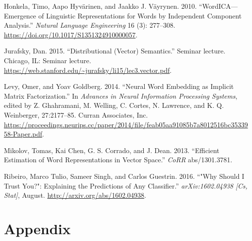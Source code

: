\documentclass{article}
\begin{document}
\leavevmode\hypertarget{ref-honkela_wordicaemergence_2010}{}%
Honkela, Timo, Aapo Hyvärinen, and Jaakko J. Väyrynen. 2010.
``WordICA---Emergence of Linguistic Representations for Words by
Independent Component Analysis.'' \emph{Natural Language Engineering} 16
(3): 277--308. \url{https://doi.org/10.1017/S1351324910000057}.

\leavevmode\hypertarget{ref-jurafsky_distributional_2015}{}%
Jurafsky, Dan. 2015. ``Distributional (Vector) Semantics.'' Seminar
lecture. Chicago, IL: Seminar lecture.
\url{https://web.stanford.edu/~jurafsky/li15/lec3.vector.pdf}.

\leavevmode\hypertarget{ref-levy_neural_2014}{}%
Levy, Omer, and Yoav Goldberg. 2014. ``Neural Word Embedding as Implicit
Matrix Factorization.'' In \emph{Advances in Neural Information
Processing Systems}, edited by Z. Ghahramani, M. Welling, C. Cortes, N.
Lawrence, and K. Q. Weinberger, 27:2177--85. Curran Associates, Inc.
\url{https://proceedings.neurips.cc/paper/2014/file/feab05aa91085b7a8012516bc3533958-Paper.pdf}.

\leavevmode\hypertarget{ref-mikolov_efficient_2013}{}%
Mikolov, Tomas, Kai Chen, G. S. Corrado, and J. Dean. 2013. ``Efficient
Estimation of Word Representations in Vector Space.'' \emph{CoRR}
abs/1301.3781.

\leavevmode\hypertarget{ref-ribeiro_why_2016}{}%
Ribeiro, Marco Tulio, Sameer Singh, and Carlos Guestrin. 2016. ``"Why
Should I Trust You?": Explaining the Predictions of Any Classifier.''
\emph{arXiv:1602.04938 {[}Cs, Stat{]}}, August.
\url{http://arxiv.org/abs/1602.04938}.

\newpage

\hypertarget{appendix}{%
\section*{Appendix}\label{appendix}}

\label{sec:appendix}
\end{document}
